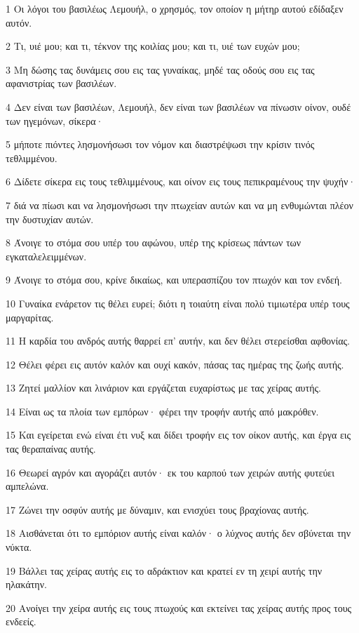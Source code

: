 \par 1 Οι λόγοι του βασιλέως Λεμουήλ, ο χρησμός, τον οποίον η μήτηρ αυτού εδίδαξεν αυτόν.
\par 2 Τι, υιέ μου; και τι, τέκνον της κοιλίας μου; και τι, υιέ των ευχών μου;
\par 3 Μη δώσης τας δυνάμεις σου εις τας γυναίκας, μηδέ τας οδούς σου εις τας αφανιστρίας των βασιλέων.
\par 4 Δεν είναι των βασιλέων, Λεμουήλ, δεν είναι των βασιλέων να πίνωσιν οίνον, ουδέ των ηγεμόνων, σίκερα·
\par 5 μήποτε πιόντες λησμονήσωσι τον νόμον και διαστρέψωσι την κρίσιν τινός τεθλιμμένου.
\par 6 Δίδετε σίκερα εις τους τεθλιμμένους, και οίνον εις τους πεπικραμένους την ψυχήν·
\par 7 διά να πίωσι και να λησμονήσωσι την πτωχείαν αυτών και να μη ενθυμώνται πλέον την δυστυχίαν αυτών.
\par 8 Άνοιγε το στόμα σου υπέρ του αφώνου, υπέρ της κρίσεως πάντων των εγκαταλελειμμένων.
\par 9 Άνοιγε το στόμα σου, κρίνε δικαίως, και υπερασπίζου τον πτωχόν και τον ενδεή.
\par 10 Γυναίκα ενάρετον τις θέλει ευρεί; διότι η τοιαύτη είναι πολύ τιμιωτέρα υπέρ τους μαργαρίτας.
\par 11 Η καρδία του ανδρός αυτής θαρρεί επ' αυτήν, και δεν θέλει στερείσθαι αφθονίας.
\par 12 Θέλει φέρει εις αυτόν καλόν και ουχί κακόν, πάσας τας ημέρας της ζωής αυτής.
\par 13 Ζητεί μαλλίον και λινάριον και εργάζεται ευχαρίστως με τας χείρας αυτής.
\par 14 Είναι ως τα πλοία των εμπόρων· φέρει την τροφήν αυτής από μακρόθεν.
\par 15 Και εγείρεται ενώ είναι έτι νυξ και δίδει τροφήν εις τον οίκον αυτής, και έργα εις τας θεραπαίνας αυτής.
\par 16 Θεωρεί αγρόν και αγοράζει αυτόν· εκ του καρπού των χειρών αυτής φυτεύει αμπελώνα.
\par 17 Ζώνει την οσφύν αυτής με δύναμιν, και ενισχύει τους βραχίονας αυτής.
\par 18 Αισθάνεται ότι το εμπόριον αυτής είναι καλόν· ο λύχνος αυτής δεν σβύνεται την νύκτα.
\par 19 Βάλλει τας χείρας αυτής εις το αδράκτιον και κρατεί εν τη χειρί αυτής την ηλακάτην.
\par 20 Ανοίγει την χείρα αυτής εις τους πτωχούς και εκτείνει τας χείρας αυτής προς τους ενδεείς.
